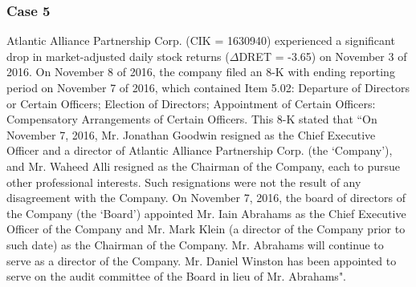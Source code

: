 \subsubsection*{Case 5}
Atlantic Alliance Partnership Corp. (CIK = 1630940) experienced a significant drop in market-adjusted daily stock returns ($\Delta$DRET = -3.65) on November 3 of 2016. On November 8 of 2016, the company filed an 8-K with ending reporting period on November 7 of 2016, which contained Item 5.02: Departure of Directors or Certain Officers; Election of Directors; Appointment of Certain Officers: Compensatory Arrangements of Certain Officers. This 8-K stated that ``On November 7, 2016, Mr. Jonathan Goodwin resigned as the Chief Executive Officer and a director of Atlantic Alliance Partnership Corp. (the `Company'), and Mr. Waheed Alli resigned as the Chairman of the Company, each to pursue other professional interests. Such resignations were not the result of any disagreement with the Company. On November 7, 2016, the board of directors of the Company (the `Board') appointed Mr. Iain Abrahams as the Chief Executive Officer of the Company and Mr. Mark Klein (a director of the Company prior to such date) as the Chairman of the Company. Mr. Abrahams will continue to serve as a director of the Company. Mr. Daniel Winston has been appointed to serve on the audit committee of the Board in lieu of Mr. Abrahams".